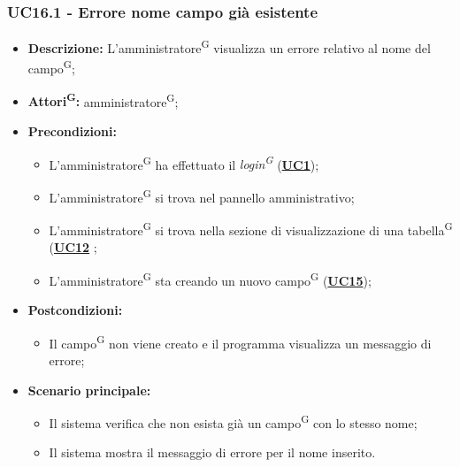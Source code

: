\subsubsection{UC16.1 - Errore nome campo già esistente}
\label{sec:UC16.1}
\begin{itemize}
	\item \textbf{Descrizione:} L’amministratore\textsuperscript{G} visualizza un errore relativo al nome del campo\textsuperscript{G};
	\item \textbf{Attori\textsuperscript{G}:} amministratore\textsuperscript{G};
	\item \textbf{Precondizioni:} 
	\begin{itemize}
		\item L’amministratore\textsuperscript{G} ha effettuato il \textit{login\textsuperscript{G}} (\hyperref[sec:UC1]{\textbf{UC1}});
		\item L’amministratore\textsuperscript{G} si trova nel pannello amministrativo;
		\item L’amministratore\textsuperscript{G} si trova nella sezione di visualizzazione di una tabella\textsuperscript{G} (\hyperref[sec:UC12]{\textbf{UC12}} ;
		\item L’amministratore\textsuperscript{G} sta creando un nuovo campo\textsuperscript{G} (\hyperref[sec:UC15]{\textbf{UC15}});
	\end{itemize}
	\item \textbf{Postcondizioni:} 
	\begin{itemize}
		\item Il campo\textsuperscript{G} non viene creato e il programma visualizza un messaggio di errore;
	\end{itemize}
	\item \textbf{Scenario principale:} 
	\begin{itemize}
		\item Il sistema verifica che non esista già un campo\textsuperscript{G} con lo stesso nome;
		\item Il sistema mostra il messaggio di errore per il nome inserito.
	\end{itemize}
\end{itemize}

